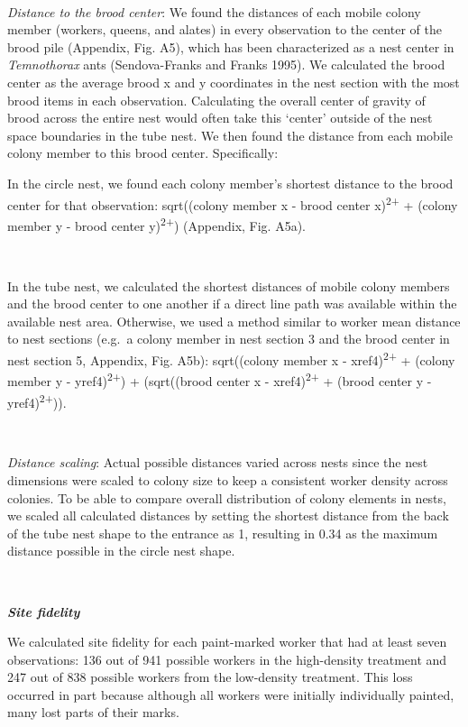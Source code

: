 \documentclass[3p]{elsarticle} %
\begin{document}
~

\emph{Distance to the brood center}: We found the distances of each
mobile colony member (workers, queens, and alates) in every observation
to the center of the brood pile (Appendix, Fig. A5), which has been
characterized as a nest center in \emph{Temnothorax} ants
(Sendova-Franks and Franks 1995). We calculated the brood center as the
average brood x and y coordinates in the nest section with the most
brood items in each observation. Calculating the overall center of
gravity of brood across the entire nest would often take this `center'
outside of the nest space boundaries in the tube nest. We then found the
distance from each mobile colony member to this brood center.
Specifically:

In the circle nest, we found each colony member's shortest distance to
the brood center for that observation: sqrt((colony member x - brood
center x)\textsuperscript{2+} + (colony member y - brood center
y)\textsuperscript{2+}) (Appendix, Fig. A5a).

~

In the tube nest, we calculated the shortest distances of mobile colony
members and the brood center to one another if a direct line path was
available within the available nest area. Otherwise, we used a method
similar to worker mean distance to nest sections (e.g.~a colony member
in nest section 3 and the brood center in nest section 5, Appendix, Fig.
A5b): sqrt((colony member x - xref4)\textsuperscript{2+} + (colony
member y - yref4)\textsuperscript{2+}) + (sqrt((brood center x -
xref4)\textsuperscript{2+} + (brood center y -
yref4)\textsuperscript{2+})).

~

\emph{Distance scaling}: Actual possible distances varied across nests
since the nest dimensions were scaled to colony size to keep a
consistent worker density across colonies. To be able to compare overall
distribution of colony elements in nests, we scaled all calculated
distances by setting the shortest distance from the back of the tube
nest shape to the entrance as 1, resulting in 0.34 as the maximum
distance possible in the circle nest shape.

~

\textbf{\emph{Site fidelity}}

We calculated site fidelity for each paint-marked worker that had at
least seven observations: 136 out of 941 possible workers in the
high-density treatment and 247 out of 838 possible workers from the
low-density treatment. This loss occurred in part because although all
workers were initially individually painted, many lost parts of their
marks.
\end{document}
